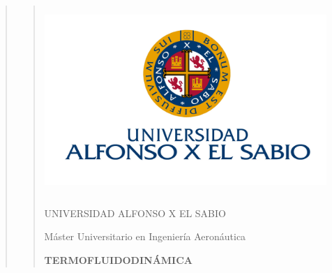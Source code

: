 \documentclass[11pt, a4paper]{article}
\begin{document}
\begin{quote}
\begin{center}

\setlength{\parskip}{12pt} %


\begin{adjustwidth}{-1.7cm}{-1cm}
\begin{quote}
\begin{center}
\begin{spacing}{1.2} %


\setlength{\parskip}{8pt} %
\vspace*{1cm} %
\begin{center}
\includegraphics[width=4.209424in,height=2.805199507in]{media/image1.png}
\end{center}

\thispagestyle{empty}
\vspace{1.3cm} %
{\fontsize{17}{20}\selectfont UNIVERSIDAD ALFONSO X EL SABIO}

\vspace{1cm} %
{\fontsize{17}{20}\selectfont Máster Universitario en Ingeniería Aeronáutica}

\vspace{1cm} %
{\fontsize{18}{20}\selectfont\textbf{TERMOFLUIDODINÁMICA}}

\vspace{1cm} %



\end{spacing}
\end{center}
\end{quote}
\end{adjustwidth}
\end{center}
\end{quote}
\end{document}
